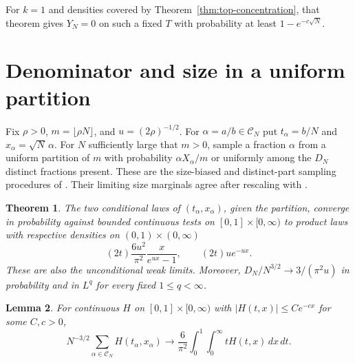 \documentclass[11pt]{amsart}
\newtheorem{theorem}{Theorem}[section]
\newtheorem{lemma}[theorem]{Lemma}
\theoremstyle{remark}
\newcommand{\CN}{\mathcal C_N}
\begin{document}
For \(k=1\) and densities covered by Theorem~\ref{thm:top-concentration},
that theorem gives \(Y_N=0\) on such a fixed \(T\) with probability at
least \(1-e^{-c\sqrt N}\).

\section{Denominator and size in a uniform partition}\label{sec:sampling}

Fix \(\rho>0\), \(m=\lfloor\rho N\rfloor\), and \(u=(2\rho)^{-1/2}\).
For \(\alpha=a/b\in\CN\) put \(t_\alpha=b/N\) and \(x_\alpha=\sqrt N\,\alpha\).
For \(N\) sufficiently large that \(m>0\), sample a fraction \(\alpha\)
from a uniform partition of \(m\) with probability \(\alpha X_\alpha/m\)
or uniformly among the \(D_N\) distinct fractions present. These are the size-biased and distinct-part sampling
procedures of \cite{corteel-et-al}. Their limiting size marginals agree
after rescaling with \cite[Theorems~2--3]{mutafchiev}.

\begin{theorem}\label{thm:sampling}
The two conditional laws of \((t_\alpha,x_\alpha)\), given the partition,
converge in probability against bounded continuous tests on
\([0,1]\times[0,\infty)\) to product laws with respective densities
on \((0,1)\times(0,\infty)\)
\begin{equation}\label{eq:sampling-limits}
  (2t)\frac{6u^2}{\pi^2}\frac{x}{e^{ux}-1},
  \qquad (2t)u e^{-ux}.
\end{equation}
These are also the unconditional weak limits. Moreover,
\(D_N/N^{3/2}\to 3/(\pi^2u)\) in probability and in \(L^q\) for every
fixed \(1\le q<\infty\).
\end{theorem}

\begin{lemma}\label{lem:sampling-coprime}
For continuous \(H\) on \([0,1]\times[0,\infty)\) with
\(|H(t,x)|\le C e^{-cx}\) for some \(C,c>0\),
\begin{equation}\label{eq:sampling-coprime}
 N^{-3/2}\sum_{\alpha\in\CN} H(t_\alpha,x_\alpha)
 \longrightarrow \frac{6}{\pi^2}\int_0^1\int_0^\infty tH(t,x)\,dx\,dt .
\end{equation}
\end{lemma}
\end{document}
